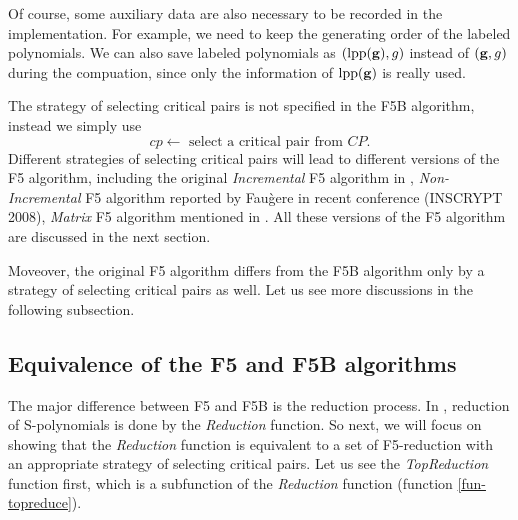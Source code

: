 \documentclass[preprint,authoryear,3p,12pt]{elsarticle}
\def\lpp{{\rm lpp}}
\def\gb{{\bf g}}
\def\lla{{\longleftarrow}}
\begin{document}
Of course, some auxiliary data are also necessary to be recorded in the implementation. For example, we need to keep   the
generating order of the labeled polynomials. We can also save labeled polynomials as $(\lpp(\gb), g)$ instead of $(\gb, g)$
during the compuation, since only the information of $\lpp(\gb)$ is really used.

The strategy of selecting critical pairs is not specified in the F5B
algorithm, instead we simply use $$cp \lla \mbox{ select a critical
pair from } CP.$$ Different strategies of selecting critical pairs
will lead to different versions of the F5 algorithm, including the
original {\em Incremental} F5 algorithm in \citep{Fau02}, {\em
Non-Incremental} F5 algorithm
reported by Fau\`gere in recent conference (INSCRYPT 2008), {\em
Matrix} F5 algorithm mentioned in \citep{Bardet03}. All these
versions of the F5 algorithm are discussed in the next section.

Moveover, the original F5 algorithm differs from the F5B algorithm only by a strategy of selecting critical pairs as well. Let us
see more discussions in the following subsection.



\subsection{Equivalence of the F5 and F5B algorithms}
\label{subsec-equivalence}

The major difference between   F5   \citep{Fau02} and F5B   is the reduction process. In \citep{Fau02}, reduction of
S-polynomials is done by the {\em Reduction} function. So next, we will focus on showing that the {\em Reduction} function is
equivalent to a set of F5-reduction with an appropriate strategy of selecting critical pairs. Let us see the {\em TopReduction}
function first, which is a subfunction of the {\em Reduction} function (function \ref{fun-topreduce}).
\end{document}
